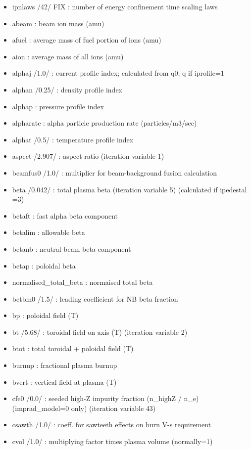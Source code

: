 \documentclass[]{article}
\begin{document}
\begin{itemize}
\itemsep1pt\parskip0pt
\item
  ipnlaws /42/ FIX : number of energy confinement time scaling laws
\item
  abeam : beam ion mass (amu)
\item
  afuel : average mass of fuel portion of ions (amu)
\item
  aion : average mass of all ions (amu)
\item
  alphaj /1.0/ : current profile index; calculated from q0, q if
  iprofile=1
\item
  alphan /0.25/ : density profile index
\item
  alphap : pressure profile index
\item
  alpharate : alpha particle production rate (particles/m3/sec)
\item
  alphat /0.5/ : temperature profile index
\item
  aspect /2.907/ : aspect ratio (iteration variable 1)
\item
  beamfus0 /1.0/ : multiplier for beam-background fusion calculation
\item
  beta /0.042/ : total plasma beta (iteration variable 5) (calculated if
  ipedestal =3)
\item
  betaft : fast alpha beta component
\item
  betalim : allowable beta
\item
  betanb : neutral beam beta component
\item
  betap : poloidal beta
\item
  normalised\_total\_beta : normaised total beta
\item
  betbm0 /1.5/ : leading coefficient for NB beta fraction
\item
  bp : poloidal field (T)
\item
  bt /5.68/ : toroidal field on axis (T) (iteration variable 2)
\item
  btot : total toroidal + poloidal field (T)
\item
  burnup : fractional plasma burnup
\item
  bvert : vertical field at plasma (T)
\item
  cfe0 /0.0/ : seeded high-Z impurity fraction (n\_highZ / n\_e)
  (imprad\_model=0 only) (iteration variable 43)
\item
  csawth /1.0/ : coeff. for sawteeth effects on burn V-s requirement
\item
  cvol /1.0/ : multiplying factor times plasma volume (normally=1)

\end{itemize}
\end{document}
